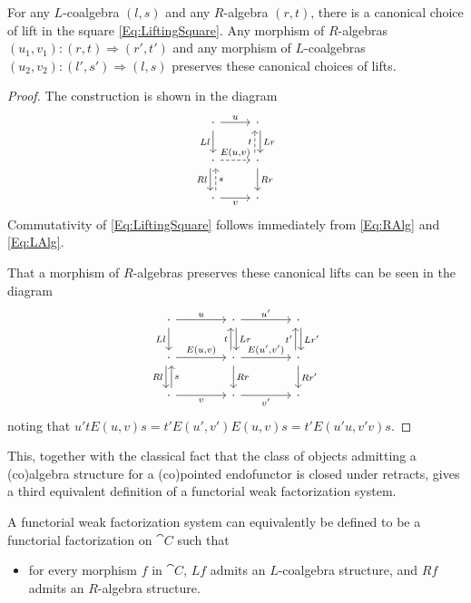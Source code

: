 \begin{lemma}
	For any $L$-coalgebra $(l,s)$ and any $R$-algebra $(r,t)$, there is a canonical choice of lift in the square \eqref{Eq:LiftingSquare}. Any morphism of $R$-algebras $(u_1,v_1)\colon (r,t)\Rightarrow (r',t')$ and any morphism of $L$-coalgebras $(u_2,v_2)\colon (l',s')\Rightarrow (l,s)$ preserves these canonical choices of lifts.
\end{lemma}
\begin{proof}
	The construction is shown in the diagram
	\begin{equation}\label{Eq:CanonicalLift}
	\begin{tikzcd}
		\cdot 	\rar{u} 
				\dar[swap]{Ll} 
			& \cdot \dar[xshift=0.5ex]{Lr} \\
		\cdot 	\rar[dashed]{E(u,v)} 
				\dar[xshift=-0.5ex][swap]{Rl} 
			& \cdot \uar[xshift=-0.5ex,dashed]{t} 
				\dar{Rr} \\
		\cdot 	\uar[xshift=0.5ex,dashed][swap]{s}
				\rar[swap]{v}
			& \cdot
	\end{tikzcd}
	\end{equation}
	Commutativity of \eqref{Eq:LiftingSquare} follows immediately from \eqref{Eq:RAlg} and \eqref{Eq:LAlg}.

	That a morphism of $R$-algebras preserves these canonical lifts can be seen in the diagram
	\[
	\begin{tikzcd}[column sep=4em]
		\cdot 	\rar{u} 
				\dar[swap]{Ll} 
			& \cdot \rar{u'}
				\dar[xshift=0.5ex]{Lr} 
			& \cdot \dar[xshift=0.5ex]{Lr'} \\
		\cdot 	\rar{E(u,v)} 
				\dar[xshift=-0.5ex][swap]{Rl} 
			& \cdot \rar{E(u',v')} 
				\uar[xshift=-0.5ex]{t} 
				\dar{Rr} 
			& \cdot \uar[xshift=-0.5ex]{t'} 
				\dar{Rr'} \\
		\cdot 	\uar[xshift=0.5ex][swap]{s}
				\rar[swap]{v}
			& \cdot \rar[swap]{v'}
			& \cdot
	\end{tikzcd}
	\]
	noting that $u'tE(u,v)s = t'E(u',v')E(u,v)s = t'E(u'u,v'v)s$.
\end{proof}

This, together with the classical fact that the class of objects admitting a (co)algebra structure for a (co)pointed endofunctor is closed under retracts, gives a third equivalent definition of a functorial weak factorization system.

\begin{lemma}
	A functorial weak factorization system can equivalently be defined to be a functorial factorization on $\cat{C}$ such that
	\begin{itemize}
		\item for every morphism $f$ in $\cat{C}$, $Lf$ admits an $L$-coalgebra structure, and $Rf$ admits an $R$-algebra structure.
	\end{itemize}
\end{lemma}

